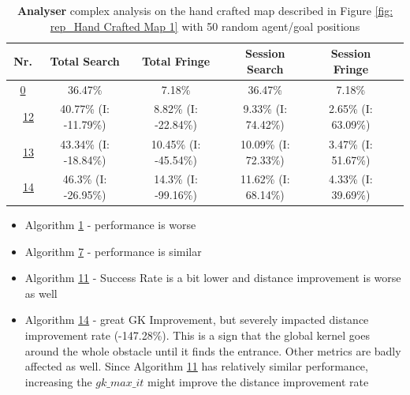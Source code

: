 \begin{table}[h!]
\bigskip

\begin{tabular}{|cc|c|c|c|c|c|}
\hline
\multicolumn{2}{|c|}{\textbf{Nr.}} & \textbf{Total Search} & \textbf{Total Fringe} & \textbf{Session Search} & \textbf{Session Fringe}\\
\hline
\hline
\multicolumn{2}{|c|}{\cellcolor{lightgray!20} \hyperref[tab: evalalgorithms]{0}} & 36.47\% & 7.18\% & 36.47\% & 7.18\%\\
\hline
\hline
\multicolumn{1}{|M{0.15cm}}{\cellcolor{cyan!40}} & \multicolumn{1}{M{0.15cm}|}{\cellcolor{blue!40} \hspace*{-0.5cm}\hyperref[tab: evalalgorithms]{12}} & 40.77\% (I: -11.79\%) & 8.82\% (I: -22.84\%) & 9.33\% (I: 74.42\%) & 2.65\% (I: 63.09\%)\\
\hline
\multicolumn{1}{|M{0.15cm}}{\cellcolor{cyan!40}} & \multicolumn{1}{M{0.15cm}|}{\cellcolor{red!40} \hspace*{-0.5cm}\hyperref[tab: evalalgorithms]{13}} & 43.34\% (I: -18.84\%) & 10.45\% (I: -45.54\%) & 10.09\% (I: 72.33\%) & 3.47\% (I: 51.67\%)\\
\hline
\multicolumn{1}{|M{0.15cm}}{\cellcolor{cyan!40}} & \multicolumn{1}{M{0.15cm}|}{\cellcolor{orange!40} \hspace*{-0.5cm}\hyperref[tab: evalalgorithms]{14}} & 46.3\% (I: -26.95\%) & 14.3\% (I: -99.16\%) & 11.62\% (I: 68.14\%) & 4.33\% (I: 39.69\%)\\
\hline
\end{tabular}


\caption{\textbf{Analyser} complex analysis on the hand crafted map described in Figure \ref{fig: rep_Hand Crafted Map 1} with 50 random agent/goal positions}
\label{tab: eval_complex_analysis_map_4} 
\end{table}

\begin{itemize}
    \item Algorithm \hyperref[tab: evalalgorithms]{1} - performance is worse
    \item Algorithm \hyperref[tab: evalalgorithms]{7} - performance is similar
    \item Algorithm \hyperref[tab: evalalgorithms]{11} - Success Rate is a bit lower and distance improvement is worse as well
    \item Algorithm \hyperref[tab: evalalgorithms]{14} - great GK Improvement, but severely impacted distance improvement rate (-147.28\%). This is a sign that the global kernel goes around the whole obstacle until it finds the entrance. Other metrics are badly affected as well. Since Algorithm \hyperref[tab: evalalgorithms]{11} has relatively similar performance, increasing the $gk\_max\_it$ might improve the distance improvement rate
\end{itemize}

\pagebreak